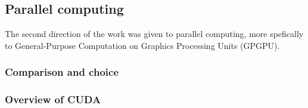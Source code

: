 \subsection{Parallel computing}
The second direction of the work was given to parallel computing, more spefically to General-Purpose Computation on Graphics Processing Units (GPGPU). 

\subsubsection{Comparison and choice}


\subsubsection{Overview of CUDA}


